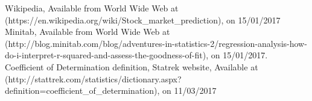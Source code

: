 \begin{thebibliography}{9}
 Wikipedia, Available from World Wide Web at (https://en.wikipedia.org/wiki/Stock\_market\_prediction), on 15/01/2017 
 Minitab, Available from World Wide Web at (http://blog.minitab.com/blog/adventures-in-statistics-2/regression-analysis-how-do-i-interpret-r-squared-and-assess-the-goodness-of-fit), on 15/01/2017.
 Coefficient of Determination definition, Statrek website, Available at (http://stattrek.com/statistics/dictionary.aspx?definition=coefficient\_of\_determination), on 11/03/2017

\end{thebibliography}